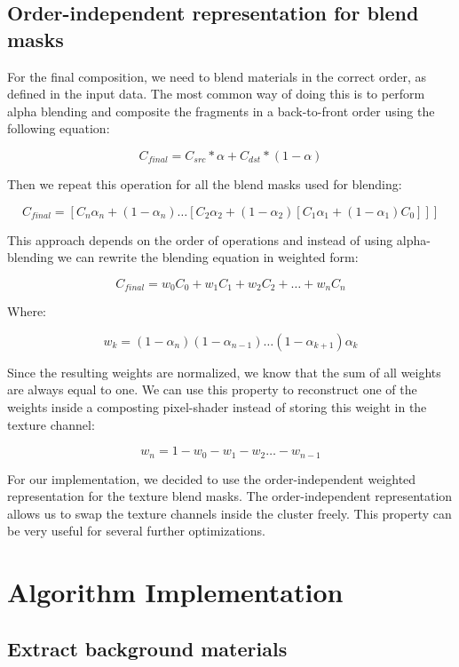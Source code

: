 \subsection{Order-independent representation for blend masks}

For the final composition, we need to blend materials in the correct order, as defined in the input data.
The most common way of doing this is to perform alpha blending and composite the fragments in a back-to-front order using the following equation:

\[
C_{final} = C_{src} * \alpha + C_{dst} * (1 - \alpha)
\]

Then we repeat this operation for all the blend masks used for blending:

\[
C_{final} = \left[C_n \alpha _n +(1 - \alpha _n) \dots \left[ C_2 \alpha _2 + (1 - \alpha _2) \left[ C_1 \alpha _1 +(1 - \alpha _1)C_0 \right]\right]\right]
\]

This approach depends on the order of operations and instead of using alpha-blending we can rewrite the blending equation in weighted form:

\[
C_{final} = w_0 C_0 + w_1 C_1 + w_2 C_2 + \dots + w_n C_n 
\]

Where:

\[
w_{k} = (1 - \alpha _n) (1 - \alpha _{n-1}) \dots (1 - \alpha _{k+1}) \alpha_k
\]

Since the resulting weights are normalized, we know that the sum of all weights are always equal to one.
We can use this property to reconstruct one of the weights inside a composting pixel-shader instead of storing this weight in the texture channel:

\[
w_n = 1 - w_0 - w_1 - w_2 \dots - w_{n-1}
\]

For our implementation, we decided to use the order-independent weighted representation for the texture blend masks.
The order-independent representation allows us to swap the texture channels inside the cluster freely.
This property can be very useful for several further optimizations.

\section{Algorithm Implementation}

\subsection{Extract background materials}

